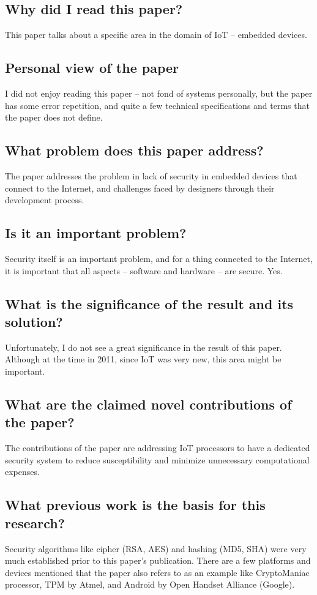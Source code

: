 \documentclass[11pt,a4paper]{article}
\begin{document}
\subsection*{Why did I read this paper?}
This paper talks about a specific area in the domain of IoT – embedded devices.

\subsection*{Personal view of the paper}
I did not enjoy reading this paper – not fond of systems personally, but the paper has some error repetition, and quite a few technical specifications and terms that the paper does not define.

\subsection*{What problem does this paper address?}
The paper addresses the problem in lack of security in embedded devices that connect to the Internet, and challenges faced by designers through their development process.

\subsection*{Is it an important problem?}
Security itself is an important problem, and for a thing connected to the Internet, it is important that all aspects – software and hardware – are secure. Yes.

\subsection*{What is the significance of the result and its solution?}
Unfortunately, I do not see a great significance in the result of this paper. Although at the time in 2011, since IoT was very new, this area might be important.

\subsection*{What are the claimed novel contributions of the paper?}
The contributions of the paper are addressing IoT processors to have a dedicated security system to reduce susceptibility and minimize unnecessary computational expenses.

\subsection*{What previous work is the basis for this research?}
Security algorithms like cipher (RSA, AES) and hashing (MD5, SHA) were very much established prior to this paper’s publication. There are a few platforms and devices mentioned that the paper also refers to as an example like CryptoManiac processor, TPM by Atmel, and Android by Open Handset Alliance (Google).
\end{document}
